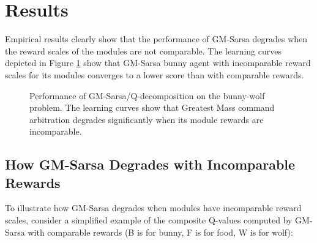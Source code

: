 \section{Results}

Empirical results clearly show that the performance of GM-Sarsa degrades when the reward scales of the modules are not comparable. The learning curves depicted in Figure \ref{fig:gmsarsa-results} show that GM-Sarsa bunny agent with incomparable reward scales for its modules converges to a lower score than with comparable rewards.

\begin{figure}[ht]
  \begin{center}
    \caption{Performance of GM-Sarsa/Q-decomposition on the bunny-wolf problem. The learning curves show that Greatest Mass command arbitration degrades significantly when its module rewards are incomparable.}
  \end{center}
  \label{fig:gmsarsa-results}
\end{figure}

\subsection{How GM-Sarsa Degrades with Incomparable Rewards}

To illustrate how GM-Sarsa degrades when modules have incomparable reward scales, consider a simplified example of the composite Q-values computed by GM-Sarsa with comparable rewards (B is for bunny, F is for food, W is for wolf):


